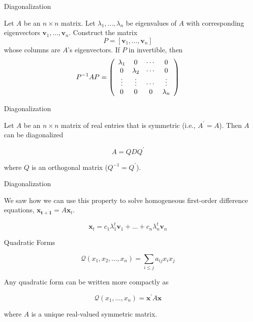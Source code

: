 \documentclass[11pt, xcolor={dvipsnames}, hyperref={colorlinks, allcolors=Blue}]{beamer}
\newcommand{\x}{\mathbf{x}}
\renewcommand{\v}{\mathbf{v}}
\begin{document}
\begin{frame}{Diagonalization}
\begin{theorem}
Let $A$ be an $n\times n$ matrix. Let $\lambda_1,\dots,\lambda_n$ be eigenvalues of $A$ with corresponding eigenvectors $\v_1,\dots,\v_n$. Construct the matrix
\[P = [\v_1, \dots, \v_n]\]
whose columns are $A$'s eigenvectors. If $P$ in invertible, then
\[ P^{-1}AP = 
\left (
\begin{array}{c c c c }
\lambda_1 & 0 & \cdots & 0\\
0 & \lambda_2 & \cdots & 0\\
\vdots & \vdots & \cdots & \vdots\\
0 & 0 & 0 & \lambda_n
\end{array}
\right )
\]
\end{theorem}
\end{frame}
\begin{frame}{Diagonalization}
\begin{theorem}
Let $A$ be an $n\times n$ matrix of real entries that is symmetric (i.e., $A^{\prime} = A$). Then $A$ can be diagonalized 

\[A = Q D Q^{\prime}\]

where $Q$ is an orthogonal matrix ($Q^{-1} = Q^{\prime}$).
\end{theorem}
\end{frame}
\begin{frame}{Diagonalization}

We saw how we can use this property to solve homogeneous first-order difference equations, $\mathbf{x_{t+1}} = A \mathbf{x}_{t}$. 

\[\mathbf{x}_t = c_1 \lambda_1^t \mathbf{v}_1 + \dots + c_n \lambda_n^t \mathbf{v}_n\]
\end{frame}

\begin{frame}{Quadratic Forms}

\[\mathcal{Q}(x_{1},x_{2},\dots, x_{n}) = \sum_{i \leq j} a_{ij}x_{i}x_{j}\]
\bigskip

Any quadratic form can be written more compactly as
\bigskip

\[\mathcal{Q}(x_{1},\dots,x_{n}) = \x^{'}A\x\]
\bigskip

where $A$ is a unique real-valued symmetric matrix.

\end{frame}
\end{document}
